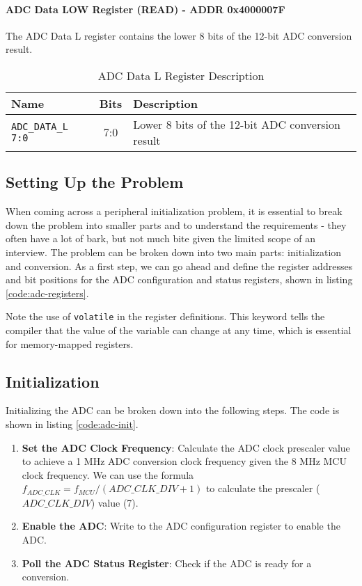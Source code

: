\documentclass[main.tex]{subfiles}
\begin{document}
\paragraph{ADC Data LOW Register (READ) - ADDR 0x4000007F}
The ADC Data L register contains the lower 8 bits of the 12-bit ADC conversion result.
\begin{table}[h!]
    \centering
    \begin{tabular}{|l|c|p{10cm}|}
        \hline
        \textbf{Name} & \textbf{Bits} & \textbf{Description} \\ \hline
        \texttt{ADC\_DATA\_L 7:0} & 7:0 & Lower 8 bits of the 12-bit ADC conversion result \\ \hline
    \end{tabular}
    \caption{ADC Data L Register Description}
    \label{tab:adc_data_l_register}
\end{table}

\spoilerline

\subsection{Setting Up the Problem}
When coming across a peripheral initialization problem, it is essential to break down the problem into smaller parts and to understand the requirements - they often have a lot of bark, but not much bite given the limited scope of an interview. The problem can be broken down into two main parts: initialization and conversion. As a first step, we can go ahead and define the register addresses and bit positions for the ADC configuration and status registers, shown in listing \ref{code:adc-registers}.


\noindent Note the use of \texttt{volatile} in the register definitions. This keyword tells the compiler that the value of the variable can change at any time, which is essential for memory-mapped registers.

\subsection {Initialization} 
Initializing the ADC can be broken down into the following steps. The code is shown in listing \ref{code:adc-init}.
\begin{enumerate}
    \item \textbf{Set the ADC Clock Frequency}: Calculate the ADC clock prescaler value to achieve a 1 MHz ADC conversion clock frequency given the 8 MHz MCU clock frequency. We can use the formula $f_{ADC\_CLK} = f_{MCU}/(ADC\_CLK\_DIV + 1)$ to calculate the prescaler ($ADC\_CLK\_DIV$) value (7).
    \item \textbf{Enable the ADC}: Write to the ADC configuration register to enable the ADC.
    \item \textbf{Poll the ADC Status Register}: Check if the ADC is ready for a conversion.
\end{enumerate}
\end{document}

